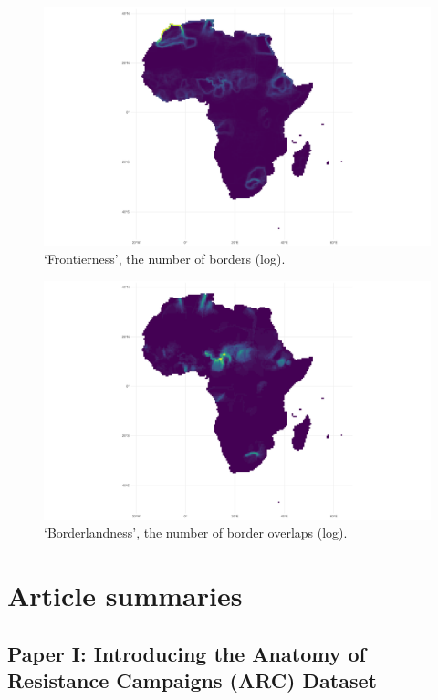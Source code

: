 \begin{figure}[hpbt]
	\centering
	\includegraphics[width=\linewidth]{img/sp_b_sum.pdf}
	\caption{`Frontierness', the number of borders (log).}%
	\label{fig:borders}
\end{figure}

\begin{figure}[hpbt]
	\centering
	\includegraphics[width=\linewidth]{img/sp_o.pdf}
	\caption{`Borderlandness', the number of border overlaps (log).}%
	\label{fig:overlaps}
\end{figure}

\section{Article summaries} \label{Article summaries}

\subsection{Paper I: Introducing the Anatomy of Resistance Campaigns (ARC) Dataset}
\label{Paper 1}

